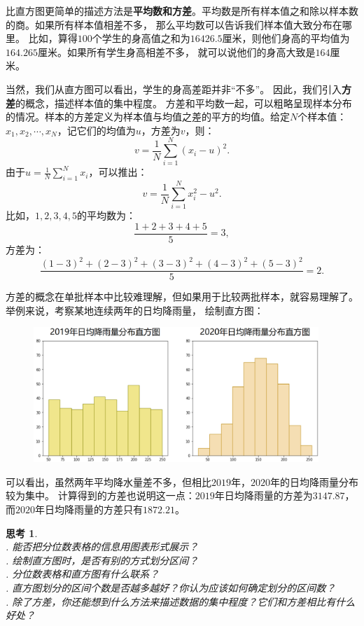 \documentclass[12pt,UTF8]{ctexbook}
\newtheorem{sk}{思考}[section]
\begin{document}
比直方图更简单的描述方法是\textbf{平均数和方差}。平均数是所有样本值之和除以样本数的商。如果所有样本值相差不多，
那么平均数可以告诉我们样本值大致分布在哪里。
比如，算得$100$个学生的身高值之和为$16426.5$厘米，则他们身高的平均值为$164.265$厘米。如果所有学生身高相差不多，
就可以说他们的身高大致是$164$厘米。

当然，我们从直方图可以看出，学生的身高差距并非“不多”。
因此，我们引入\textbf{方差}的概念，描述样本值的集中程度。
方差和平均数一起，可以粗略呈现样本分布的情况。样本的方差定义为样本值与均值之差的平方的均值。给定$N$个样本值：
$x_1, x_2, \cdots, x_N$，记它们的均值为$u$，方差为$v$，则：
$$ v = \frac{1}{N}\sum_{i=1}^N \left(x_i - u\right)^2.$$
由于$u = \frac{1}{N}\sum_{i=1}^N x_i$，可以推出：
$$v = \frac{1}{N}\sum_{i=1}^N x_i^2 - u^2.$$
比如，$1,2,3,4,5$的平均数为：
$$ \frac{1+2+3+4+5}{5} = 3,$$
方差为：
$$ \frac{(1 - 3)^2 + (2 - 3)^2 + (3 - 3)^2 + (4 - 3)^2 + (5 - 3)^2}{5} = 2.$$

方差的概念在单批样本中比较难理解，但如果用于比较两批样本，就容易理解了。举例来说，考察某地连续两年的日均降雨量，
绘制直方图：
\begin{figure}[H] %
    \vspace{10pt}
    \centering
    \includegraphics[width=0.96\textwidth]{直方图方差1.png}
\end{figure}
可以看出，虽然两年平均降水量差不多，但相比$2019$年，$2020$年的日均降雨量分布较为集中。
计算得到的方差也说明这一点：$2019$年日均降雨量的方差为$3147.87$，而$2020$年日均降雨量的方差只有$1872.21$。


\begin{sk}
    \mbox{} \\
    . 能否把分位数表格的信息用图表形式展示？\\
    . 绘制直方图时，是否有别的方式划分区间？\\
    . 分位数表格和直方图有什么联系？\\
    . 直方图划分的区间个数是否越多越好？你认为应该如何确定划分的区间数？\\
    . 除了方差，你还能想到什么方法来描述数据的集中程度？它们和方差相比有什么好处？
\end{sk}
\end{document}
